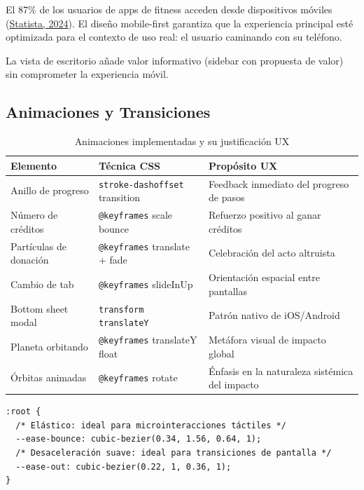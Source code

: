 \documentclass[12pt, a4paper]{article}
\begin{document}
\begin{justificacionbox}
El 87\% de los usuarios de apps de fitness acceden desde dispositivos móviles (\href{https://www.statista.com/outlook/hmo/digital-health/digital-fitness-well-being/health-wellness-coaching/fitness-apps/worldwide}{Statista, 2024}). El diseño mobile-first garantiza que la experiencia principal esté optimizada para el contexto de uso real: el usuario caminando con su teléfono.

La vista de escritorio añade valor informativo (sidebar con propuesta de valor) sin comprometer la experiencia móvil.
\end{justificacionbox}

\subsection{Animaciones y Transiciones}

\begin{table}[H]
\centering
\caption{Animaciones implementadas y su justificación UX}
\begin{tabularx}{\textwidth}{llX}
\toprule
\textbf{Elemento} & \textbf{Técnica CSS} & \textbf{Propósito UX} \\
\midrule
Anillo de progreso & \texttt{stroke-dashoffset} transition & Feedback inmediato del progreso de pasos \\
Número de créditos & \texttt{@keyframes} scale bounce & Refuerzo positivo al ganar créditos \\
Partículas de donación & \texttt{@keyframes} translate + fade & Celebración del acto altruista \\
Cambio de tab & \texttt{@keyframes} slideInUp & Orientación espacial entre pantallas \\
Bottom sheet modal & \texttt{transform translateY} & Patrón nativo de iOS/Android \\
Planeta orbitando & \texttt{@keyframes} translateY float & Metáfora visual de impacto global \\
Órbitas animadas & \texttt{@keyframes} rotate & Énfasis en la naturaleza sistémica del impacto \\
\bottomrule
\end{tabularx}
\end{table}

\begin{lstlisting}[style=css, caption={Curvas de easing custom de Nativo}]
:root {
  /* Elástico: ideal para microinteracciones táctiles */
  --ease-bounce: cubic-bezier(0.34, 1.56, 0.64, 1);
  /* Desaceleración suave: ideal para transiciones de pantalla */
  --ease-out: cubic-bezier(0.22, 1, 0.36, 1);
}
\end{lstlisting}
\end{document}
